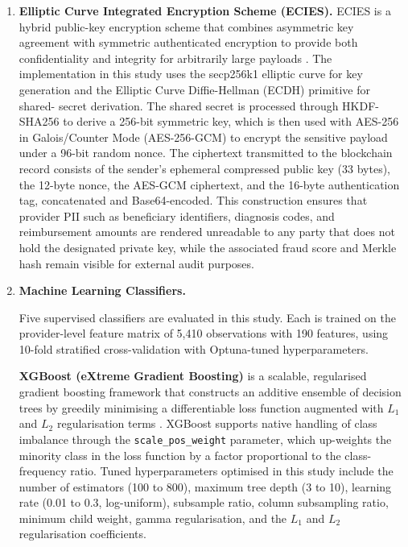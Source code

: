 \begin{enumerate}[label=\roman*.]
\item \textbf{Elliptic Curve Integrated Encryption Scheme (ECIES).}
ECIES is a hybrid public-key encryption scheme that combines asymmetric key
agreement with symmetric authenticated encryption to provide both
confidentiality and integrity for arbitrarily large payloads \cite{shoup2001}.
The implementation in this study uses the secp256k1 elliptic curve for key
generation and the Elliptic Curve Diffie-Hellman (ECDH) primitive for shared-
secret derivation. The shared secret is processed through HKDF-SHA256 to derive
a 256-bit symmetric key, which is then used with AES-256 in Galois/Counter Mode
(AES-256-GCM) to encrypt the sensitive payload under a 96-bit random nonce. The
ciphertext transmitted to the blockchain record consists of the sender's ephemeral
compressed public key (33 bytes), the 12-byte nonce, the AES-GCM ciphertext, and
the 16-byte authentication tag, concatenated and Base64-encoded. This construction
ensures that provider PII such as beneficiary identifiers, diagnosis codes, and
reimbursement amounts are rendered unreadable to any party that does not hold
the designated private key, while the associated fraud score and Merkle hash
remain visible for external audit purposes.

\item \textbf{Machine Learning Classifiers.}

Five supervised classifiers are evaluated in this study. Each is trained on the
provider-level feature matrix of 5,410 observations with 190 features, using
10-fold stratified cross-validation with Optuna-tuned hyperparameters.

\textbf{XGBoost (eXtreme Gradient Boosting)} is a scalable, regularised gradient
boosting framework that constructs an additive ensemble of decision trees by
greedily minimising a differentiable loss function augmented with $L_1$ and $L_2$
regularisation terms \cite{chen2016}. XGBoost supports native handling of class
imbalance through the \texttt{scale\_pos\_weight} parameter, which up-weights the
minority class in the loss function by a factor proportional to the class-
frequency ratio. Tuned hyperparameters optimised in this study include the number
of estimators (100 to 800), maximum tree depth (3 to 10), learning rate (0.01 to 0.3,
log-uniform), subsample ratio, column subsampling ratio, minimum child weight,
gamma regularisation, and the $L_1$ and $L_2$ regularisation coefficients.


\end{enumerate}
